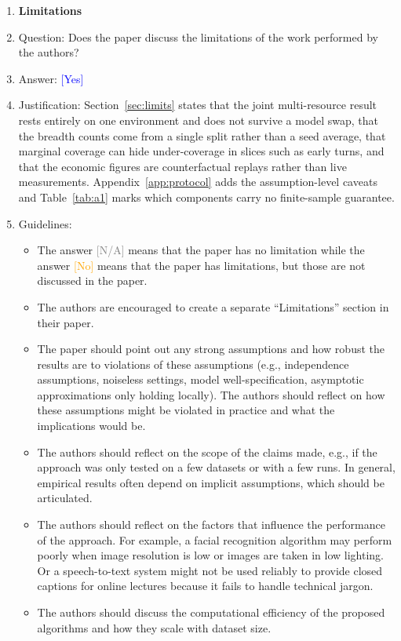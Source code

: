 \documentclass{article}
\providecommand{\answerYes}[1][]{\textcolor{blue}{[Yes] #1}}
\providecommand{\answerNo}[1][]{\textcolor{orange}{[No] #1}}
\providecommand{\answerNA}[1][]{\textcolor{gray}{[N/A] #1}}
\begin{document}
\begin{enumerate}
\item {\bf Limitations}
    \item[] Question: Does the paper discuss the limitations of the work performed by the authors?
    \item[] Answer: \answerYes{}
    \item[] Justification: Section~\ref{sec:limits} states that the joint multi-resource result rests entirely on one environment and does not survive a model swap, that the breadth counts come from a single split rather than a seed average, that marginal coverage can hide under-coverage in slices such as early turns, and that the economic figures are counterfactual replays rather than live measurements. Appendix~\ref{app:protocol} adds the assumption-level caveats and Table~\ref{tab:a1} marks which components carry no finite-sample guarantee.
    \item[] Guidelines:
    \begin{itemize}
        \item The answer \answerNA{} means that the paper has no limitation while the answer \answerNo{} means that the paper has limitations, but those are not discussed in the paper.
        \item The authors are encouraged to create a separate ``Limitations'' section in their paper.
        \item The paper should point out any strong assumptions and how robust the results are to violations of these assumptions (e.g., independence assumptions, noiseless settings, model well-specification, asymptotic approximations only holding locally). The authors should reflect on how these assumptions might be violated in practice and what the implications would be.
        \item The authors should reflect on the scope of the claims made, e.g., if the approach was only tested on a few datasets or with a few runs. In general, empirical results often depend on implicit assumptions, which should be articulated.
        \item The authors should reflect on the factors that influence the performance of the approach. For example, a facial recognition algorithm may perform poorly when image resolution is low or images are taken in low lighting. Or a speech-to-text system might not be used reliably to provide closed captions for online lectures because it fails to handle technical jargon.
        \item The authors should discuss the computational efficiency of the proposed algorithms and how they scale with dataset size.

\end{itemize}
\end{enumerate}
\end{document}
